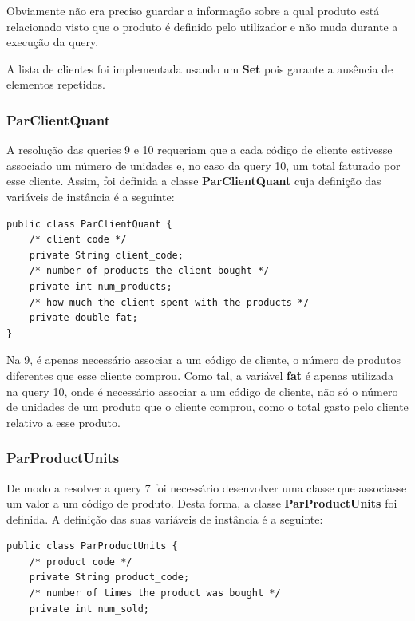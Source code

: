 \documentclass[10pt] {article}
\begin{document}
Obviamente não era preciso guardar a informação sobre a qual produto está relacionado visto que o produto é definido pelo utilizador e não muda durante a execução da query.

A lista de clientes foi implementada usando um \color{blue} \textbf{Set} \color{black} pois garante a ausência de elementos 
repetidos.

\subsubsection{ParClientQuant}

A resolução das queries 9 e 10 requeriam que a cada código de cliente estivesse associado um número de unidades e, no caso da query 10, um total faturado por esse cliente. Assim, foi definida a classe \color{blue} \textbf{ParClientQuant} \color{black} cuja
definição das variáveis de instância é a seguinte:

\begin{lstlisting}
public class ParClientQuant {
    /* client code */
	private String client_code;
	/* number of products the client bought */
    private int num_products;
    /* how much the client spent with the products */
    private double fat;
}
\end{lstlisting}


Na  9, é apenas necessário associar a um código de cliente, o número de produtos diferentes que esse cliente comprou.
Como tal, a variável \textbf{fat} é apenas utilizada na query 10, onde é necessário associar a um código de cliente, não só o número de unidades de um produto que o cliente comprou, como o total gasto pelo cliente relativo a esse produto.

\subsubsection{ParProductUnits}

De modo a resolver a query 7 foi necessário desenvolver uma classe que associasse um valor a um código de produto.
Desta forma, a classe \color{blue} \textbf{ParProductUnits} \color{black} foi definida. A definição das suas variáveis de instância 
é a seguinte:

\begin{lstlisting}
public class ParProductUnits {
	/* product code */
    private String product_code;
    /* number of times the product was bought */
    private int num_sold;
\end{lstlisting}
\end{document}
